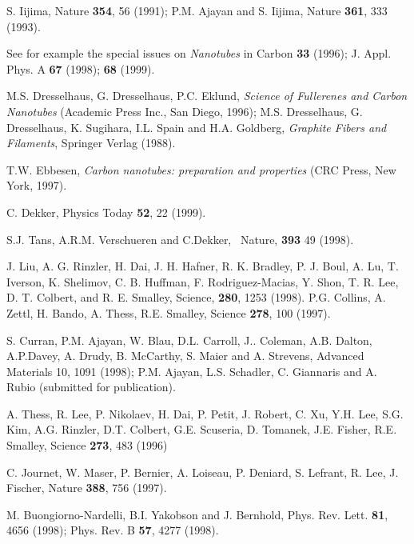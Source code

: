 \begin{multicols}{2}
\begin{thebibliography}{99}

  S. Iijima, Nature {\bf 354}, 56 (1991); P.M. Ajayan and S.
Iijima, Nature {\bf 361}, 333 (1993).

  See for example the special issues on {\it Nanotubes} in
Carbon {\bf 33} (1996); J. Appl. Phys. A {\bf 67} (1998); {\bf 68} (1999).

  M.S. Dresselhaus, G. Dresselhaus, P.C. Eklund, {\it Science
of Fullerenes and Carbon Nanotubes} (Academic Press Inc., San Diego, 1996);
M.S. Dresselhaus, G. Dresselhaus, K. Sugihara, I.L. Spain and H.A. Goldberg,
{\it Graphite Fibers and Filaments}, Springer Verlag (1988).

  T.W. Ebbesen, {\it Carbon nanotubes: preparation and
properties} (CRC Press, New York, 1997).

 C. Dekker, Physics Today {\bf 52}, 22 (1999).

 S.J. Tans, A.R.M. Verschueren and C.Dekker, {\ Nature}, {\bf 393} 49 (1998).


 J. Liu, A. G. Rinzler, H. Dai, J. H. Hafner, R. K. Bradley, P.
J. Boul, A. Lu, T. Iverson, K. Shelimov, C. B. Huffman, F.
Rodriguez-Macias, Y. Shon, T. R. Lee, D. T. Colbert, and R. E.
Smalley, Science, {\bf 280}, 1253 (1998). P.G. Collins, A. Zettl,
H. Bando, A. Thess, R.E. Smalley, Science {\bf 278}, 100 (1997).

 S. Curran, P.M. Ajayan, W. Blau, D.L.
Carroll, J.. Coleman, A.B. Dalton, A.P.Davey, A. Drudy, B. McCarthy, S.
Maier and  A. Strevens,  Advanced Materials 10, 1091 (1998);
 P.M. Ajayan, L.S. Schadler, C. Giannaris and A. Rubio
 (submitted for publication).

  A. Thess, R. Lee, P. Nikolaev, H. Dai, P. Petit, J.
Robert, C. Xu, Y.H. Lee, S.G. Kim, A.G. Rinzler, D.T. Colbert, G.E.
Scuseria, D. Tomanek, J.E. Fisher, R.E. Smalley, Science {\bf 273}, 483
(1996)

  C. Journet, W. Maser, P. Bernier, A. Loiseau, P.
Deniard, S. Lefrant, R. Lee, J. Fischer, Nature {\bf 388}, 756 (1997).



  M. Buongiorno-Nardelli, B.I. Yakobson and J. Bernhold,
Phys. Rev. Lett. {\bf 81}, 4656 (1998); Phys. Rev. B {\bf 57}, 4277 (1998).


\end{thebibliography}
\end{multicols}
